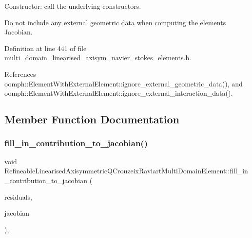 Constructor\+: call the underlying constructors. 

Do not include any external geometric data when computing the element\textquotesingle{}s Jacobian. 

Definition at line 441 of file multi\+\_\+domain\+\_\+linearised\+\_\+axisym\+\_\+navier\+\_\+stokes\+\_\+elements.\+h.



References oomph\+::\+Element\+With\+External\+Element\+::ignore\+\_\+external\+\_\+geometric\+\_\+data(), and oomph\+::\+Element\+With\+External\+Element\+::ignore\+\_\+external\+\_\+interaction\+\_\+data().



\subsection{Member Function Documentation}
\mbox{\label{classRefineableLinearisedAxisymmetricQCrouzeixRaviartMultiDomainElement_a5040c64ce7752b950ee33fa18e8eb7c1}} 
\subsubsection{\texorpdfstring{fill\+\_\+in\+\_\+contribution\+\_\+to\+\_\+jacobian()}{fill\_in\_contribution\_to\_jacobian()}}
{\footnotesize\ttfamily void Refineable\+Linearised\+Axisymmetric\+Q\+Crouzeix\+Raviart\+Multi\+Domain\+Element\+::fill\+\_\+in\+\_\+contribution\+\_\+to\+\_\+jacobian (\begin{DoxyParamCaption}\item[{\hyperlink{classoomph_1_1Vector}{Vector}$<$ double $>$ \&}]{residuals,  }\item[{\hyperlink{classoomph_1_1DenseMatrix}{Dense\+Matrix}$<$ double $>$ \&}]{jacobian }\end{DoxyParamCaption})\hspace{0.3cm}{\ttfamily [inline]}, {\ttfamily [virtual]}}



